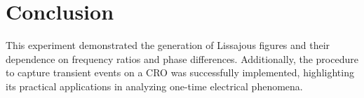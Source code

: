 \documentclass[a4paper,12pt]{article}
\begin{document}
\section*{Conclusion}
This experiment demonstrated the generation of Lissajous figures and their dependence on frequency ratios and phase differences. Additionally, the procedure to capture transient events on a CRO was successfully implemented, highlighting its practical applications in analyzing one-time electrical phenomena.
\end{document}
